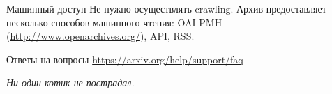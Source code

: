 \documentclass[14pt]{beamer}
\begin{document}
\begin{frame}{Машинный доступ}
Не нужно осуществлять crawling. Архив предоставляет несколько способов машинного чтения: OAI-PMH (\url{http://www.openarchives.org/}), API, RSS.
\end{frame}

\begin{frame}{Ответы на вопросы}
\url{https://arxiv.org/help/support/faq}
\end{frame}

\begin{frame}[nologo]
\centering\textit{Ни один котик не пострадал.}
\end{frame}

\itmothankyou
\end{document}
